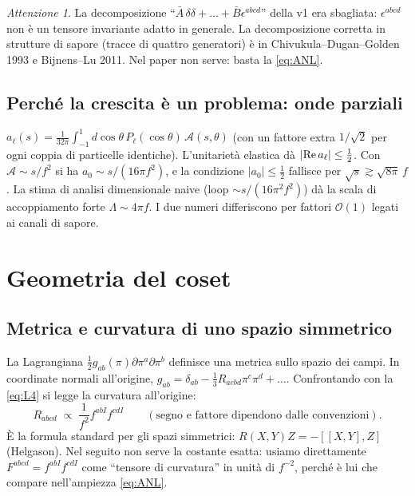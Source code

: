 \documentclass[11pt,a4paper]{article}
\numberwithin{equation}{section}
\theoremstyle{remark}
\newtheorem*{attenzione}{Attenzione}
\begin{document}
\begin{attenzione}
La decomposizione ``$\bar A\,\delta\delta+\ldots+\bar B\epsilon^{abcd}$'' della v1 era sbagliata: $\epsilon^{abcd}$ non è un tensore invariante adatto in generale. La decomposizione corretta in strutture di sapore (tracce di quattro generatori) è in Chivukula--Dugan--Golden 1993 e Bijnens--Lu 2011. Nel paper non serve: basta la \eqref{eq:ANL}.
\end{attenzione}

\subsection{Perché la crescita è un problema: onde parziali}

$a_\ell(s)=\frac{1}{32\pi}\int_{-1}^1d\cos\theta\,P_\ell(\cos\theta)\,\mathcal A(s,\theta)$ (con un fattore extra $1/\sqrt2$ per ogni coppia di particelle identiche). L'unitarietà elastica dà $|{\rm Re}\,a_\ell|\le\frac12$. Con $\mathcal A\sim s/f^2$ si ha $a_0\sim s/(16\pi f^2)$, e la condizione $|a_0|\le\frac12$ fallisce per $\sqrt s\gtrsim\sqrt{8\pi}\,f$. La stima di analisi dimensionale naive (loop $\sim s/(16\pi^2f^2)$) dà la scala di accoppiamento forte $\Lambda\sim4\pi f$. I due numeri differiscono per fattori $\mathcal O(1)$ legati ai canali di sapore.

\section{Geometria del coset}
\label{sec:geom}

\subsection{Metrica e curvatura di uno spazio simmetrico}

La Lagrangiana $\frac12g_{ab}(\pi)\partial\pi^a\partial\pi^b$ definisce una metrica sullo spazio dei campi. In coordinate normali all'origine, $g_{ab}=\delta_{ab}-\frac13R_{acbd}\pi^c\pi^d+\dots$. Confrontando con la \eqref{eq:L4} si legge la curvatura all'origine:
\begin{equation}
R_{abcd}\;\propto\;\frac{1}{f^2}f^{abI}f^{cdI}\qquad(\text{segno e fattore dipendono dalle convenzioni}).
\end{equation}
È la formula standard per gli spazi simmetrici: $R(X,Y)Z=-[[X,Y],Z]$ (Helgason). Nel seguito non serve la costante esatta: usiamo direttamente $F^{abcd}=f^{abI}f^{cdI}$ come ``tensore di curvatura'' in unità di $f^{-2}$, perché è lui che compare nell'ampiezza \eqref{eq:ANL}.
\end{document}
